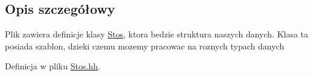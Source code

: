 \subsection{Opis szczegółowy}
Plik zawiera definicje klasy \hyperlink{class_stos}{Stos}, ktora bedzie struktura naszych danych. Klasa ta posiada szablon, dzieki czemu mozemy pracowac na roznych typach danych 

Definicja w pliku \hyperlink{_stos_8hh_source}{Stos.hh}.

